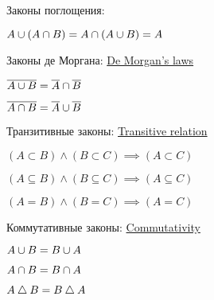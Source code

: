 \documentclass[a4paper,10pt]{article}
\begin{document}
\begin{multicols}{2}
\begin{terms}
    \item Законы поглощения:
    \begin{terms}
        \item $A \cup (A \cap B) = A \cap (A \cup B) = A$
    \end{terms}

    \item Законы де Моргана:
    \hfill\href{https://en.wikipedia.org/wiki/De_Morgan\%27s_laws}{De Morgan's laws}
    \begin{terms}
        \item $\overline{A \cup B} = \overline{A} \cap \overline{B}$
        \item $\overline{A \cap B} = \overline{A} \cup \overline{B}$
    \end{terms}

    \columnbreak

    \item Транзитивные законы:
    \hfill\href{https://en.wikipedia.org/wiki/Transitive_relation}{Transitive relation}
    \begin{terms}
        \item $(A \subset B) \land (B \subset C) \implies (A \subset C)$
        \item $(A \subseteq B) \land (B \subseteq C) \implies (A \subseteq C)$
        \item $(A = B) \land (B = C) \implies (A = C)$
    \end{terms}


    \item Коммутативные законы:
    \hfill\href{https://en.wikipedia.org/wiki/Commutative_property}{Commutativity}
    \begin{terms}
        \item $A \cup B = B \cup A$
        \item $A \cap B = B \cap A$
        \item $A \mathbin{\triangle} B = B \mathbin{\triangle} A$
    \end{terms}


\end{terms}
\end{multicols}
\end{document}
